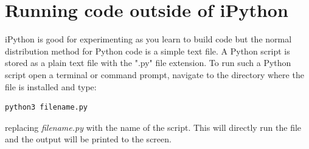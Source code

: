 \section{Running code outside of iPython}

	iPython is good for experimenting as you learn to build code but the normal distribution method for Python code is a simple text file. A Python script is stored as a plain text file with the ".py" file extension. To run such a Python script open a terminal or command prompt, navigate to the directory where the file is installed and type:
	\begin{lstlisting}
python3 filename.py\end{lstlisting}
	
	replacing \textit{filename.py} with the name of the script. This will directly run the file and the output will be printed to the screen.
